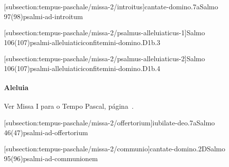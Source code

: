 \def\Prefix{subsection:tempus-paschale/missa-2}

[\Prefix/introitus]{cantate-domino.7a}{Salmo 97(98)}{psalmi-ad-introitum}

[\Prefix/psalmus-alleluiaticus-1]{Salmo 106(107)}{psalmi-alleluiatici}{confitemini-domino.D1b.3}

\AllowPageFlush

[\Prefix/psalmus-alleluiaticus-2]{Salmo 106(107)}{psalmi-alleluiatici}{confitemini-domino.D1b.4}

\paragraph{Aleluia}
\begin{rubrica}
  Ver Missa I para o Tempo Pascal, página~\pageref{subsection:tempus-paschale/missa-1/alleluia}.
\end{rubrica}

\AllowPageFlush

[\Prefix/offertorium]{iubilate-deo.7a}{Salmo 46(47)}{psalmi-ad-offertorium}

\AllowPageFlush

[\Prefix/communio]{cantate-domino.2D}{Salmo 95(96)}{psalmi-ad-communionem}